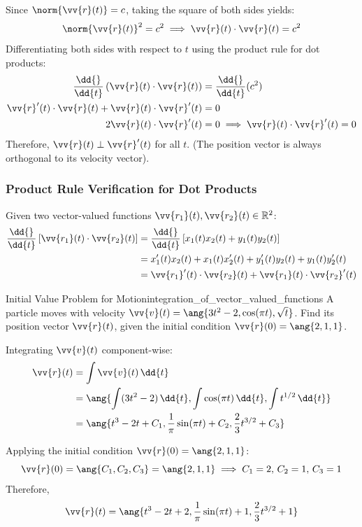 \begin{sol}
Since $\norm{\vv{r}(t)} = c$, taking the square of both sides yields:
\[
\norm{\vv{r}(t)}^2 = c^2 \implies \vv{r}(t) \cdot \vv{r}(t) = c^2
\]
Differentiating both sides with respect to $t$ using the product rule for dot products:
\begin{align*}
\frac{\dd{}}{\dd{t}}\left(\vv{r}(t) \cdot \vv{r}(t)\right) &= \frac{\dd{}}{\dd{t}}(c^2) \\
\vv{r}'(t) \cdot \vv{r}(t) + \vv{r}(t) \cdot \vv{r}'(t) &= 0 \\
2\vv{r}(t) \cdot \vv{r}'(t) &= 0 \implies \vv{r}(t) \cdot \vv{r}'(t) = 0
\end{align*}
Therefore, $\vv{r}(t) \perp \vv{r}'(t)$ for all $t$. (The position vector is always orthogonal to its velocity vector).
\end{sol}

\subsubsection*{Product Rule Verification for Dot Products}
Given two vector-valued functions $\vv{r_1}(t), \vv{r_2}(t) \in \mathbb{R}^2$:
\begin{align*}
\frac{\dd{}}{\dd{t}}\left[\vv{r_1}(t) \cdot \vv{r_2}(t)\right] &= \frac{\dd{}}{\dd{t}}\left[x_1(t)x_2(t) + y_1(t)y_2(t)\right] \\
&= x_1'(t)x_2(t) + x_1(t)x_2'(t) + y_1'(t)y_2(t) + y_1(t)y_2'(t) \\
&= \vv{r_1}'(t) \cdot \vv{r_2}(t) + \vv{r_1}(t) \cdot \vv{r_2}'(t)
\end{align*}

\begin{problem}{Initial Value Problem for Motion}{integration_of_vector_valued_functions}
A particle moves with velocity $\vv{v}(t) = \ang{3t^2 - 2, \cos (\pi t), \sqrt{t}}$. Find its position vector $\vv{r}(t)$, given the initial condition $\vv{r}(0) = \ang{2, 1, 1}$.
\end{problem}

\begin{sol}
Integrating $\vv{v}(t)$ component-wise:
\begin{align*}
\vv{r}(t) &= \int \vv{v}(t) \, \dd{t} \\
&= \ang{\int (3t^2 - 2) \, \dd{t}, \int \cos (\pi t) \, \dd{t}, \int t^{1/2} \, \dd{t}} \\
&= \ang{t^3 - 2t + C_1, \frac{1}{\pi} \sin (\pi t) + C_2, \frac{2}{3} t^{3/2} + C_3}
\end{align*}

Applying the initial condition $\vv{r}(0) = \ang{2, 1, 1}$:
\[
\vv{r}(0) = \ang{C_1, C_2, C_3} = \ang{2, 1, 1} \implies C_1 = 2, \, C_2 = 1, \, C_3 = 1
\]
Therefore,
\[
\vv{r}(t) = \ang{t^3 - 2t + 2, \frac{1}{\pi} \sin (\pi t) + 1, \frac{2}{3} t^{3/2} + 1}
\]
\end{sol}

